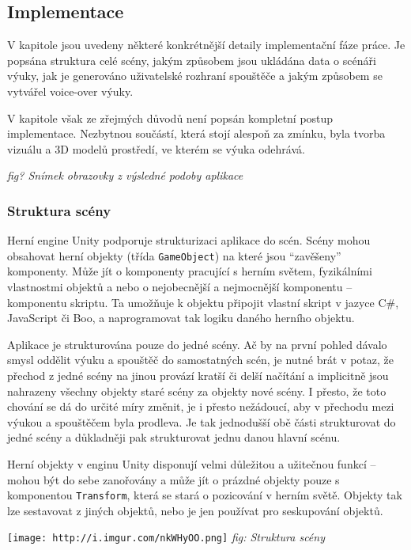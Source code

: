 \subsection{Implementace}\label{implementace}

V kapitole jsou uvedeny některé konkrétnější detaily implementační fáze
práce. Je popsána struktura celé scény, jakým způsobem jsou ukládána
data o scénáři výuky, jak je generováno uživatelské rozhraní spouštěče a
jakým způsobem se vytvářel voice-over výuky.

V kapitole však ze zřejmých důvodů není popsán kompletní postup
implementace. Nezbytnou součástí, která stojí alespoň za zmínku, byla
tvorba vizuálu a 3D modelů prostředí, ve kterém se výuka odehrává.

\emph{fig? Snímek obrazovky z výsledné podoby aplikace}

\subsubsection{Struktura scény}\label{struktura-scuxe9ny}

Herní engine Unity podporuje strukturizaci aplikace do scén. Scény mohou
obsahovat herní objekty (třída \texttt{GameObject}) na které jsou
``zavěšeny'' komponenty. Může jít o komponenty pracující s herním
světem, fyzikálními vlastnostmi objektů a nebo o nejobecnější a
nejmocnější komponentu -- komponentu skriptu. Ta umožňuje k objektu
připojit vlastní skript v jazyce C\#, JavaScript či Boo, a naprogramovat
tak logiku daného herního objektu.

Aplikace je strukturována pouze do jedné scény. Ač by na první pohled
dávalo smysl oddělit výuku a spouštěč do samostatných scén, je nutné
brát v potaz, že přechod z jedné scény na jinou provází kratší či delší
načítání a implicitně jsou nahrazeny všechny objekty staré scény za
objekty nové scény. I přesto, že toto chování se dá do určité míry
změnit, je i přesto nežádoucí, aby v přechodu mezi výukou a spouštěčem
byla prodleva. Je tak jednodušší obě části strukturovat do jedné scény a
důkladněji pak strukturovat jednu danou hlavní scénu.

Herní objekty v enginu Unity disponují velmi důležitou a užitečnou
funkcí -- mohou být do sebe zanořovány a může jít o prázdné objekty
pouze s komponentou \texttt{Transform}, která se stará o pozicování v
herním světě. Objekty tak lze sestavovat z jiných objektů, nebo je jen
používat pro seskupování objektů.

\texttt{[image: http://i.imgur.com/nkWHyOO.png]} \emph{fig: Struktura
scény}

